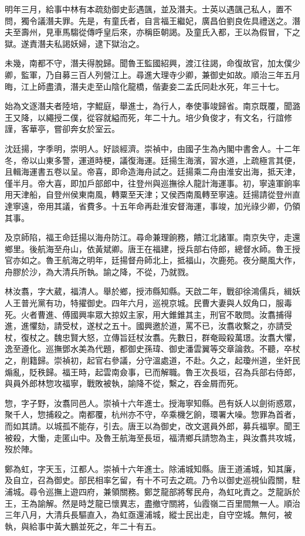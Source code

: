 \begin{pinyinscope}
{{明年三月，給事中林有本疏劾御史彭遇颽，並及潛夫。士英以遇颽己私人，置不問，獨令議潛夫罪。先是，有童氏者，自言福王繼妃，廣昌伯劉良佐具禮送之。潛夫至壽州，見車馬騶從傳呼皇后來，亦稱臣朝謁。及童氏入都，王以為假冒，下之獄。遂責潛夫私謁妖婦，逮下獄治之。

未幾，南都不守，潛夫得脫歸。聞魯王監國紹興，渡江往謁，命復故官，加太僕少卿，監軍，乃自募三百人列營江上。尋進大理寺少卿，兼御史如故。順治三年五月晦，江上師盡潰，潛夫走至山陰化龍橋，偕妻妾二孟氏同赴水死，年三十七。

始為文逐潛夫者陸培，字鯤庭，舉進士，為行人，奉使事竣歸省。南京既覆，聞潞王又降，以繩授二僕，從容就縊而死，年二十九。培少負俊才，有文名，行誼修謹，客華亭，嘗卻奔女於室云。

沈廷揚，字季明，崇明人。好談經濟。崇禎中，由國子生為內閣中書舍人。十二年冬，帝以山東多警，運道時梗，議復海運。廷揚生海濱，習水道，上疏極言其便，且輯海運書五卷以呈。帝喜，即命造海舟試之。廷揚乘二舟由淮安出海，抵天津，僅半月。帝大喜，即加戶部郎中，往登州與巡撫徐人龍計海運事。初，寧遠軍餉率用天津船，自登州侯東南風，轉粟至天津；又侯西南風轉至寧遠。廷揚請從登州直達寧遠，帝用其議，省費多。十五年命再赴淮安督海運，事竣，加光祿少卿，仍領其事。

及京師陷，福王命廷揚以海舟防江。尋命兼理餉務，饋江北諸軍。南京失守，走還鄉里。後航海至舟山，依黃斌卿。唐王在福建，授兵部右侍郎，總督水師。魯王授官亦如之。魯王航海之明年，廷揚督舟師北上，抵福山，次鹿苑。夜分颶風大作，舟膠於沙，為大清兵所執。諭之降，不從，乃就戮。

林汝翥，字大葳，福清人。舉於鄉，授沛縣知縣。天啟二年，戰卻徐鴻儒兵，緝妖人王普光黨有功，特擢御史。四年六月，巡視京城。民曹大妻與人奴角口，服毒死。火者曹進、傅國興率眾大掠奴主家，用大錐錐其主，刑官不敢問。汝翥捕得進，進懼劾，請受杖，遂杖之五十。國興邀於道，罵不已，汝翥收繫之，亦請受杖，復杖之。魏忠賢大怒，立傳旨廷杖汝翥。先數日，群奄毆殺萬璟。汝翥大懼，逸至遵化。巡撫鄧水美為代題，都御史孫瑋、御史潘雲翼等交章論救。不聽，卒杖之，削籍歸。崇禎初，起官右參議，分守溫處道，不赴。久之，起瓊州道，坐奸民煽亂，貶秩歸。福王時，起雲南僉事，已而解職。魯王次長垣，召為兵部右侍郎，與員外郎林惣攻福寧，戰敗被執，諭降不從，繫之，吞金屑而死。

惣，字子野，汝翥同邑人。崇禎十六年進士。授海寧知縣。邑有妖人以劍術惑眾，聚千人，惣捕殺之。南都覆，杭州亦不守，卒乘機乞餉，環署大噪。惣罪為首者，而如其請。以城孤不能存，引去。唐王以為御史，改文選員外郎，募兵福寧。聞王被殺，大慟，走匿山中。及魯王航海至長垣，福清鄉兵請惣為主，與汝翥共攻城，歿於陣。

鄭為虹，字天玉，江都人。崇禎十六年進士。除浦城知縣。唐王道浦城，知其廉，及自立，召為御史。部民相率乞留，有十不可去之疏。乃令以御史巡視仙霞關，駐浦城。尋令巡撫上遊四府，兼領關務。鄭芝龍部將奪民舟，為虹叱責之。芝龍訴於王，王為諭解。然是時芝龍已懷異志，盡撤守關將，仙霞嶺二百里間無一人。順治三年八月，大清兵長驅直入，為虹亟還浦城，縱士民出走，自守空城。無何，被執，與給事中黃大鵬並死之，年二十有五。

}}
\end{pinyinscope}
